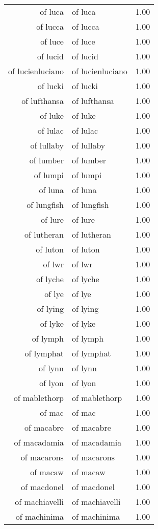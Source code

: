 \begin{table}[ht]
\begin{tabular}{rlr}
  of luca & of luca & 1.00 \\ 
  of lucca & of lucca & 1.00 \\ 
  of luce & of luce & 1.00 \\ 
  of lucid & of lucid & 1.00 \\ 
  of lucienluciano & of lucienluciano & 1.00 \\ 
  of lucki & of lucki & 1.00 \\ 
  of lufthansa & of lufthansa & 1.00 \\ 
  of luke & of luke & 1.00 \\ 
  of lulac & of lulac & 1.00 \\ 
  of lullaby & of lullaby & 1.00 \\ 
  of lumber & of lumber & 1.00 \\ 
  of lumpi & of lumpi & 1.00 \\ 
  of luna & of luna & 1.00 \\ 
  of lungfish & of lungfish & 1.00 \\ 
  of lure & of lure & 1.00 \\ 
  of lutheran & of lutheran & 1.00 \\ 
  of luton & of luton & 1.00 \\ 
  of lwr & of lwr & 1.00 \\ 
  of lyche & of lyche & 1.00 \\ 
  of lye & of lye & 1.00 \\ 
  of lying & of lying & 1.00 \\ 
  of lyke & of lyke & 1.00 \\ 
  of lymph & of lymph & 1.00 \\ 
  of lymphat & of lymphat & 1.00 \\ 
  of lynn & of lynn & 1.00 \\ 
  of lyon & of lyon & 1.00 \\ 
  of mablethorp & of mablethorp & 1.00 \\ 
  of mac & of mac & 1.00 \\ 
  of macabre & of macabre & 1.00 \\ 
  of macadamia & of macadamia & 1.00 \\ 
  of macarons & of macarons & 1.00 \\ 
  of macaw & of macaw & 1.00 \\ 
  of macdonel & of macdonel & 1.00 \\ 
  of machiavelli & of machiavelli & 1.00 \\ 
  of machinima & of machinima & 1.00 \\ 

\end{tabular}
\end{table}
